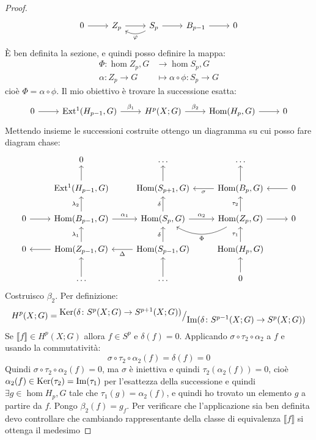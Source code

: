\begin{proof}
\[\begin{tikzcd}
      0 \rar & Z_p \rar & S_p \arrow[bend left]{l}{\phi} \rar & B_{p-1} \rar & 0
    \end{tikzcd}
  \]
  È ben definita la sezione, e quindi posso definire la mappa:
  \begin{align*}
    \Phi \colon \hom{Z_p, G} & \to \hom{S_p, G} \\
    \alpha \colon Z_p \to G & \mapsto \alpha \circ \phi \colon S_p \to G
  \end{align*}
  cioè $ \Phi = \alpha \circ \phi $.
  Il mio obiettivo è trovare la successione esatta:
  \[
    \begin{tikzcd}
      0 \rar & \ext{H_{p-1}, G} \rar{\beta_1} & H^p(X; G) \rar{\beta_2} & \hom{H_p, G} \rar & 0
    \end{tikzcd}
  \]
  Mettendo insieme le successioni costruite ottengo un diagramma su cui posso
  fare diagram chase:
  \[
    \begin{tikzcd}
      {} & 0 & \dots & \dots & {} \\
      {} & \ext{H_{p-1},G} \uar & \hom{S_{p+1},G} \uar & \lar{\sigma} \hom{B_p,G} \uar & 0 \lar \\
      0 \rar & \hom{B_{p-1}, G} \uar{\lambda_2} \rar{\alpha_1} & \rar{\alpha_2} \hom{S_p,G} \uar{\delta} & \hom{Z_p,G} \rar \uar{\tau_2} \arrow[bend left]{l}{\Phi}  & 0 \\
      0 & \lar \hom{Z_{p-1}, G} \uar{\lambda_1} & \lar{\Delta} \hom{S_{p-1},G} \uar{\delta} & \hom{H_p,G} \uar{\tau_1}  & {} \\
      {} & \dots \uar & \dots \uar & 0 \uar{} & {}
    \end{tikzcd}
  \]
  Costruisco $ \beta_2 $.
  Per definizione:
  \[
    H^p(X;G) = {^{\textstyle \mathrm{Ker}( \delta\colon S^p(X;G) \to S^{p+1}(X;G))}\big/_{\textstyle \mathrm{Im}( \delta \colon S^{p-1}(X;G) \to S^p(X;G) )}}
  \]
  Se $ \llbracket f \rrbracket \in H^p(X; G) $ allora $ f \in S^p $ e $ \delta(f) = 0 $. Applicando
  $ \sigma \circ \tau_2 \circ \alpha_2 $ a $ f $ e usando la commutatività:
  \[
    \sigma \circ \tau_2 \circ \alpha_2 (f) = \delta(f) = 0
  \]
  Quindi $ \sigma \circ \tau_2 \circ \alpha_2 (f) = 0 $, ma $ \sigma $ è iniettiva e quindi
  $ \tau_2(\alpha_2(f)) = 0 $, cioè
  $ \alpha_2(f) \in \mathrm{Ker}( \tau_2) = \mathrm{Im}( \tau_1 ) $ per l'esattezza della successione e quindi
  $ \exists g \in \hom{H_p, G} $ tale che $ \tau_1(g) = \alpha_2(f) $, e quindi ho trovato un
  elemento $ g $ a partire da $ f $. Pongo $ \beta_2(f) = g_f $. Per verificare che
  l'applicazione sia ben definita devo controllare che cambiando rappresentante
  della classe di equivalenza $ \llbracket f \rrbracket $ si ottenga il medesimo

\end{proof}
